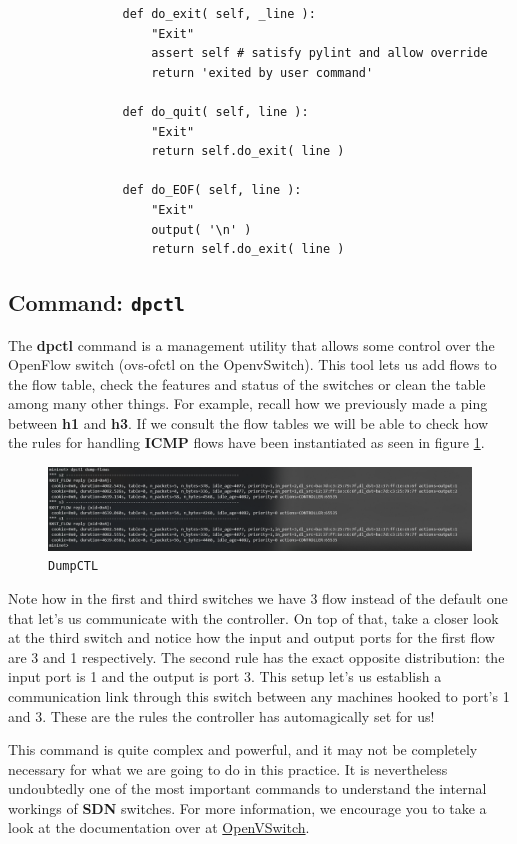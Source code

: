 \documentclass[12pt]{report}
\newcommand{\newpar} {
    \vskip 1cm
}
\begin{document}
\begin{itemize}
{{{{			\begin{verbatim}
				def do_exit( self, _line ):
					"Exit"
					assert self # satisfy pylint and allow override
					return 'exited by user command'

				def do_quit( self, line ):
					"Exit"
					return self.do_exit( line )

				def do_EOF( self, line ):
					"Exit"
					output( '\n' )
					return self.do_exit( line )
			\end{verbatim}

		\subsection{Command: \texttt{dpctl}}
			The \textbf{dpctl} command is a management utility that allows some control over the OpenFlow switch (ovs-ofctl on the OpenvSwitch). This tool lets us add flows to the flow table, check the features and status of the switches or clean the table among many other things. For example, recall how we previously made a ping between \textbf{h1} and \textbf{h3}. If we consult the flow tables we will be able to check how the rules for handling \textbf{ICMP} flows have been instantiated as seen in figure \ref{f:dpctl}.

			\begin{figure}
				\centering
				\includegraphics[scale = 1]{dpctl.png}
				\caption{\texttt{DumpCTL}}
				\label{f:dpctl}
			\end{figure}

			Note how in the first and third switches we have 3 flow instead of the default one that let's us communicate with the controller. On top of that, take a closer look at the third switch and notice how the input and output ports for the first flow are 3 and 1 respectively. The second rule has the exact opposite distribution: the input port is 1 and the output is port 3. This setup let's us establish a communication link through this switch between any machines hooked to port's 1 and 3. These are the rules the controller has automagically set for us!
			\newpar
			This command is quite complex and powerful, and it may not be completely necessary for what we are going to do in this practice. It is nevertheless undoubtedly one of the most important commands to understand the internal workings of \textbf{SDN} switches. For more information, we encourage you to take a look at the documentation over at \href{http://www.openvswitch.org/support/dist-docs/ovs-ofctl.8.txt}{OpenVSwitch}.

}}}}
\end{itemize}
\end{document}
